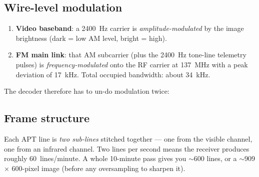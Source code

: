 \documentclass[11pt,a4paper]{article}
\begin{document}
\subsection{Wire-level modulation}

\begin{enumerate}
  \item \textbf{Video baseband}: a \SI{2400}{Hz} carrier is
        \emph{amplitude-modulated} by the image brightness (dark = low
        AM level, bright = high).
  \item \textbf{FM main link}: that AM subcarrier (plus the
        \SI{2400}{Hz} tone-line telemetry pulses) is
        \emph{frequency-modulated} onto the RF carrier at
        \SI{137}{MHz} with a peak deviation of \SI{17}{kHz}.
        Total occupied bandwidth: about \SI{34}{kHz}.
\end{enumerate}

The decoder therefore has to un-do modulation twice:

\begin{center}
\end{center}

\subsection{Frame structure}

Each APT line is \emph{two sub-lines} stitched together — one from
the visible channel, one from an infrared channel.  Two lines
per second means the receiver produces roughly \SI{60}{lines/minute}.
A whole 10-minute pass gives you $\sim$600 lines, or a $\sim$909 $\times$
600-pixel image (before any oversampling to sharpen it).
\end{document}
